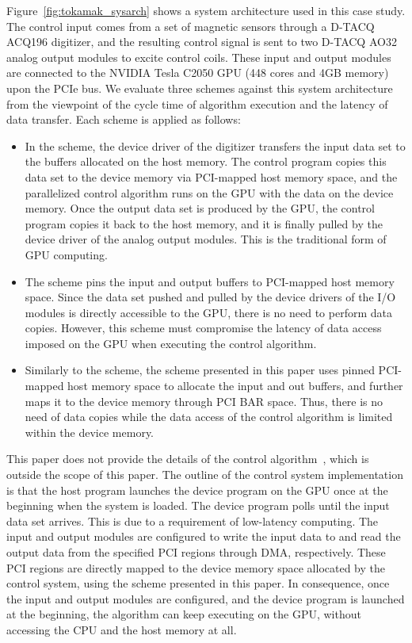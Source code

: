 Figure~\ref{fig:tokamak_sysarch} shows a system architecture used in
this case study.
The control input comes from a set of magnetic sensors through a D-TACQ
ACQ196 digitizer, and the resulting control signal is sent to two D-TACQ
AO32 analog output modules to excite control coils.
These input and output modules are connected to the NVIDIA Tesla C2050
GPU (448 cores and 4GB memory) upon the PCIe bus.
We evaluate three schemes against this system architecture
from the viewpoint of the cycle time of algorithm execution and the
latency of data transfer. 
Each scheme is applied as follows:
\begin{itemize} \itemsep1pt
 \item In the {\hd} scheme, the device driver of the digitizer transfers
       the input data set to the buffers allocated on the host memory.
       The control program copies this data set to the device memory via
       PCI-mapped host memory space, and the parallelized control
       algorithm runs on the GPU with the data on the device memory.
       Once the output data set is produced by the GPU, the control
       program copies it back to the host memory, and it is finally
       pulled by the device driver of the analog output modules.
       This is the traditional form of GPU computing.
 \item The {\hp} scheme pins the input and output buffers to PCI-mapped
       host memory space.
       Since the data set pushed and pulled by the device drivers of
       the I/O modules is directly accessible to the GPU, there is no
       need to perform data copies.
       However, this scheme must compromise the latency of data access
       imposed on the GPU when executing the control algorithm.
 \item Similarly to the {\hp} scheme, the {\dm} scheme presented in this
       paper uses pinned PCI-mapped host memory space to allocate the
       input and out buffers, and further maps it to the device memory
       through PCI BAR space.
       Thus, there is no need of data copies while the data access of
       the control algorithm is limited within the device memory.
\end{itemize}

This paper does not provide the details of the control
algorithm~\cite{Boozer_PP99}, which is outside the scope of this paper.
The outline of the control system implementation is that the host
program launches the device program on the GPU once at the beginning
when the system is loaded.
The device program polls until the input data set arrives.
This is due to a requirement of low-latency computing.
The input and output modules are configured to write the input data to
and read the output data from the specified PCI regions through DMA,
respectively.
These PCI regions are directly mapped to the device memory space
allocated by the control system, using the {\dm} scheme presented in this
paper.
In consequence, once the input and output modules are configured, and
the device program is launched at the beginning, the algorithm can keep
executing on the GPU, without accessing the CPU and the host memory at
all.

